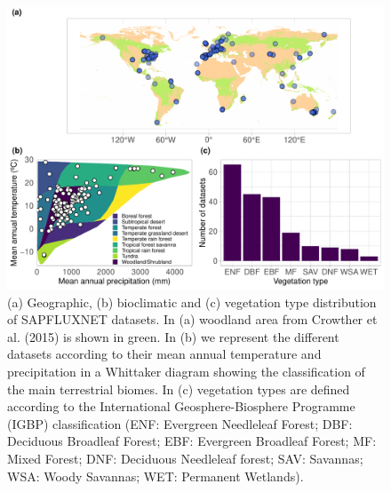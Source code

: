 \documentclass[11pt,twoside]{reedthesis}
\begin{document}
\setlength{\abovecaptionskip}{0pt}
\begin{figure}[H]

{\centering \includegraphics[width=1\linewidth]{figure/CH3/Figure2} 

}

\caption[Geographic, bioclimatic and vegetation type distribution of SAPFLUXNET datasets.]{(a) Geographic, (b) bioclimatic and (c) vegetation type distribution of SAPFLUXNET datasets. In (a) woodland area from Crowther et al. (2015) is shown in green. In (b) we represent the different datasets according to their mean annual temperature and precipitation in a Whittaker diagram showing the classification of the main terrestrial biomes. In (c) vegetation types are defined according to the International Geosphere-Biosphere Programme (IGBP) classification (ENF: Evergreen Needleleaf Forest; DBF: Deciduous Broadleaf Forest; EBF: Evergreen Broadleaf Forest; MF: Mixed Forest; DNF: Deciduous Needleleaf forest; SAV: Savannas; WSA: Woody Savannas; WET: Permanent Wetlands).}\label{fig:Ch2plot2}
\end{figure}
\setlength{\abovecaptionskip}{0pt}
\end{document}
